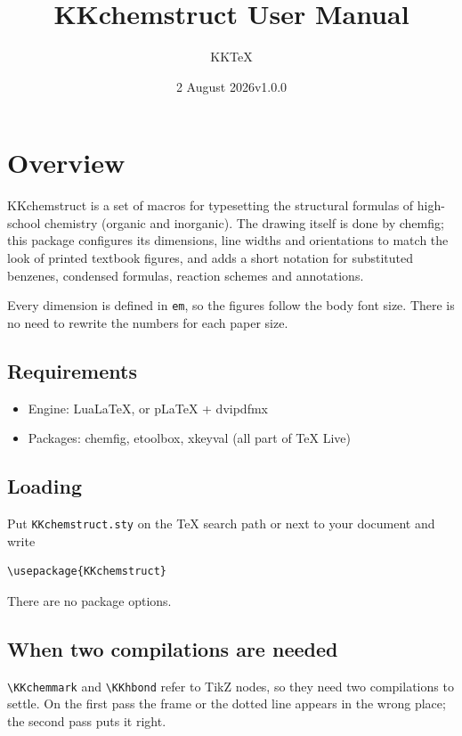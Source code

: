 \documentclass[paper=a4paper,fontsize=10pt]{jlreq}
\title{KKchemstruct User Manual}
\author{KKTeX}
\date{2 August 2026\quad v1.0.0}
\begin{document}
\maketitle
\tableofcontents

\section{Overview}

\textsf{KKchemstruct} is a set of macros for typesetting the structural formulas
of high-school chemistry (organic and inorganic). The drawing itself is done by
\textsf{chemfig}; this package configures its dimensions, line widths and
orientations to match the look of printed textbook figures, and adds a short
notation for substituted benzenes, condensed formulas, reaction schemes and
annotations.

Every dimension is defined in \verb|em|, so the figures follow the body font
size. There is no need to rewrite the numbers for each paper size.

\subsection{Requirements}

\begin{itemize}
\item Engine: LuaLaTeX, or pLaTeX + dvipdfmx
\item Packages: \textsf{chemfig}, \textsf{etoolbox}, \textsf{xkeyval}
      (all part of TeX Live)
\end{itemize}

\subsection{Loading}

Put \verb|KKchemstruct.sty| on the TeX search path or next to your document and
write

\begin{verbatim}
\usepackage{KKchemstruct}
\end{verbatim}

There are no package options.

\subsection{When two compilations are needed}

\verb|\KKchemmark| and \verb|\KKhbond| refer to TikZ nodes, so they need two
compilations to settle. On the first pass the frame or the dotted line appears
in the wrong place; the second pass puts it right.
\end{document}
